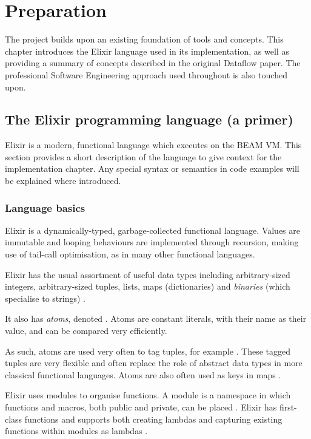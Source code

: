 \chapter{Preparation}\label{ch:prep}

The project builds upon an existing foundation of tools and concepts.
This chapter introduces the Elixir language used in its implementation, as well as providing a summary of concepts described in the original Dataflow paper.
The professional Software Engineering approach used throughout is also touched upon.

\section{The Elixir programming language (a primer)}\label{sec:prep:elixir}

Elixir is a modern, functional language which executes on the BEAM VM.
This section provides a short description of the language to give context for the implementation chapter.
Any special syntax or semantics in code examples will be explained where introduced.

\subsection{Language basics}\label{sec:prep:elixir:basics}

Elixir is a dynamically-typed, garbage-collected functional language.
Values are immutable and looping behaviours are implemented through recursion, making use of tail-call optimisation, as in many other functional languages.

Elixir has the usual assortment of useful data types including arbitrary-sized integers, arbitrary-sized tuples, lists, maps (dictionaries) and \emph{binaries} (which specialise to strings) \cite[p.~23]{Thomas:2016}.

It also has \emph{atoms}, denoted .
Atoms are constant literals, with their name as their value, and can be compared very efficiently.

As such, atoms are used very often to tag tuples, for example .
These tagged tuples are very flexible and often replace the role of abstract data types in more classical functional languages.
Atoms are also often used as keys in maps \cite[p.~29]{Thomas:2016}.

Elixir uses modules to organise functions.
A module is a namespace in which functions and macros, both public and private, can be placed \cite[p.~58]{Thomas:2016}.
Elixir has first-class functions and supports both creating lambdas and capturing existing functions within modules as lambdas \cite[p.~37]{Thomas:2016}.

